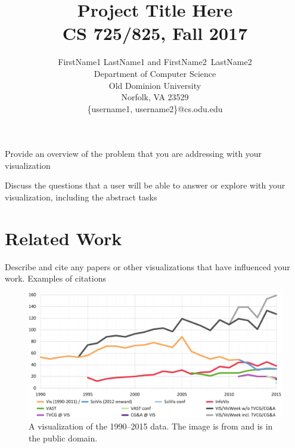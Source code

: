 \documentclass[journal]{vgtc}                %
\title{Project Title Here \\
CS 725/825, Fall 2017}
\author{FirstName1 LastName1 and FirstName2~LastName2\\
Department of Computer Science\\
Old Dominion University\\
Norfolk, VA 23529\\
\{username1, username2\}@cs.odu.edu
}
\begin{document}


\maketitle

Provide an overview of the problem that you are addressing with your visualization

Discuss the questions that a user will be able to answer or explore with your visualization, including the abstract tasks

\section{Related Work}

Describe and cite any papers or other visualizations that have influenced your work.  Examples of citations \cite{alkwai-tois17}

\cite{berlin-jcdl17, alnoamany-websci17, weigle-capwic15}

\begin{figure}[tb]
 \centering %
 \includegraphics[width=\columnwidth]{paper-count-w-2015-new}
 \caption{A visualization of the 1990--2015 data. The image is from \cite{Isenberg:2017:VMC} and is in the public domain.}
 \label{fig:sample}
\end{figure}
\end{document}
